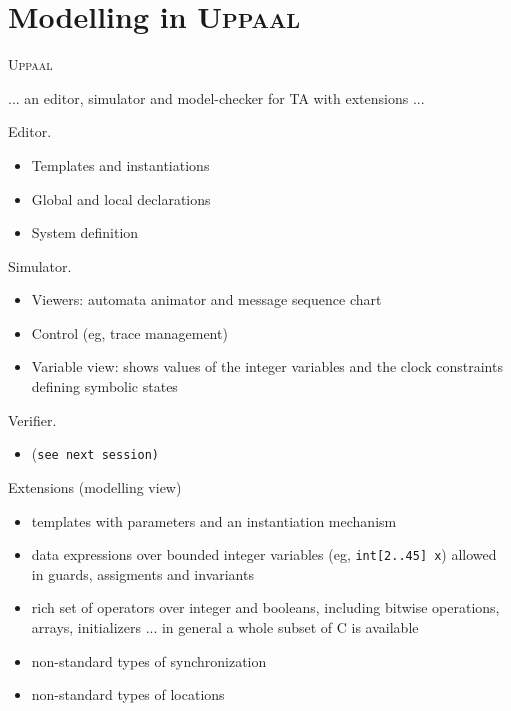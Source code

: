 \documentclass{beamer}
\def\dgold#1{{\darkgoldenrod #1}}
\def\dkb#1{{\blue #1}}
\def\uppaal{\textsc{Uppaal}}
\begin{document}
\section{Modelling in \uppaal}
\begin{slide}{\uppaal}
\small

... an \dkb{editor},  \dkb{simulator} and \dkb{model-checker} for TA with \dkb{extensions} ...

\dkb{Editor.}
\begin{itemize}
\item \dgold{Templates} and \dgold{instantiations}
\item Global and local \dgold{declarations}
\item \dgold{System definition}
\end{itemize}

\dkb{Simulator.}
\begin{itemize}
\item Viewers: \dgold{automata animator} and \dgold{message sequence chart}
\item Control (eg, \dgold{trace} management)
\item Variable view: shows values of the integer variables and the clock constraints defining symbolic states
\end{itemize}

\dkb{Verifier.}
\begin{itemize}
\item (\texttt{see next session)}
\end{itemize}

\end{slide}


\begin{slide}{Extensions (modelling view)}
\small

\begin{itemize}
\item \dkb{templates} with \dgold{parameters} and an \dgold{instantiation mechanism}
\item \dkb{data expressions} over \dkb{bounded integer variables} (eg, \texttt{int[2..45] x}) allowed in \dgold{guards},
\dgold{assigments} and \dgold{invariants}
\item rich set of \dkb{operators} over integer and booleans, including bitwise operations, arrays, initializers ... in general
a whole \dkb{subset of C} is available
\item \dkb{non-standard} types of \dgold{synchronization}
 \item \dkb{non-standard} types of \dgold{locations}
\end{itemize}
\end{slide}
\end{document}
